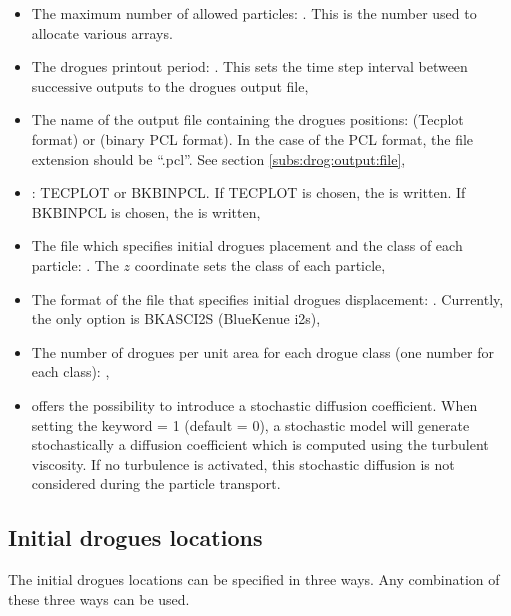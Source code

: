 \begin{itemize}
\item The maximum number of allowed particles:
.
This is the number used to allocate various arrays.

\item The drogues printout period: .
This sets the time step interval between successive outputs to the
drogues output file,

\item The name of the output file containing the drogues positions:
 (Tecplot format)
or  (binary PCL format).
In the case of the PCL format, the file extension should be “.pcl”.
See section \ref{subs:drog:output:file},

\item {}: TECPLOT or BKBINPCL.
If TECPLOT is chosen, the  is written.
If BKBINPCL is chosen, the  is written,

\item The file which specifies initial drogues placement
and the class of each particle:
.
The $z$ coordinate sets the class of each particle,

\item The format of the file that specifies initial drogues displacement:
.
Currently, the only option is BKASCI2S (BlueKenue i2s),

\item The number of drogues per unit area for each drogue class
(one number for each class): ,

\item {} offers the possibility to introduce a stochastic diffusion
coefficient.
When setting the keyword  = 1 (default = 0),
a stochastic model will generate stochastically a diffusion coefficient
which is computed using the turbulent viscosity.
If no turbulence is activated, this stochastic diffusion is not considered
during the particle transport.
\end{itemize}

\subsection{Initial drogues locations}
\label{subs:drog:init}
The initial drogues locations can be specified in three ways.
Any combination of these three ways can be used.

